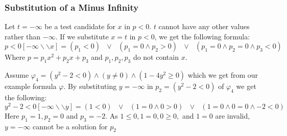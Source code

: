 \subsubsection{Substitution of a Minus Infinity}
	Let $t = -\infty$ be a test candidate for $x$ in $p<0$. $t$ cannot have any other values rather than $-\infty$. If we substitute $x = t$ in $p<0$, we get the following formula:
	$$p<0[-\infty\backslash\backslash x] = (p_{1}<0) \text{ } \vee \text{ } (p_{1}=0 \wedge p_{2}>0) \text{ } \vee \text{ } (p_{1}=0 \wedge p_{2}=0 \wedge p_{3}<0) $$
	Where $p=p_{1}x^{2}+p_{2}x+p_{3}$ and $p_{1}, p_{2}, p_{3}$ do not contain $x$.
	\begin{example}
		Assume $\varphi_{4} = (y^{2} - 2 < 0)\wedge (y \neq 0) \wedge (1-4y^{2}\geq 0)$ which we get from our example formula $\varphi$. By substituting $y=-\infty$ in $p_{2}=(y^{2} - 2 < 0)$ of $\varphi_{4}$ we get the following:
			$$ y^{2} - 2 < 0 [-\infty\backslash\backslash y] = (1<0)\text{ } \vee\text{ } (1=0 \wedge 0 > 0) \text{ } \vee \text{ } (1=0 \wedge 0=0 \wedge -2<0) $$
			Here $p_{1}=1, p_{2}=0$ and $p_{3}=-2$. As $1 \leq 0, 1 = 0, 0 \geq 0,$ and $1=0$ are invalid, $y=-\infty$ cannot be a solution for $p_{2}$
			\begin{center}
				
			\end{center}
	\end{example}
